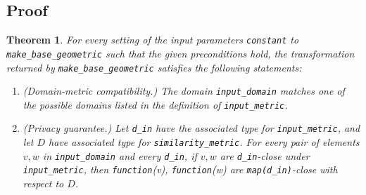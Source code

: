 \documentclass[11pt,a4paper]{article}
\newtheorem{theorem}{Theorem}[section]
\newcommand{\vicki}[1]{{ {\color{olive}{(vicki)~#1}}}}
\begin{document}
\vicki{marked bounds with [SELF::MIN, SELF::MAX] because it's an optional type in the original Rust code, and if not specified, then in SampleTwoSidedGeometric SELF::MIN and SELF::MAX are substituted}



\subsection{Proof}

\begin{theorem}
For every setting of the input parameters \texttt{constant} to \texttt{make\_base\_geometric} such that the given preconditions hold, the transformation returned by \texttt{make\_base\_geometric} satisfies the following statements:

\begin{enumerate}
    \item \textup{(Domain-metric compatibility.)} The domain \texttt{input\_domain} matches one of the possible domains listed in the definition of \texttt{input\_metric}. 
    \item \textup{(Privacy guarantee.)} Let \texttt{d\_in} have the associated type for \texttt{input\_metric}, and let $D$ have associated type for \texttt{similarity\_metric}. For every pair of elements $v, w$ in \texttt{input\_domain} and every \texttt{d\_in}, if $v, w$ are \texttt{d\_in}-close under \texttt{input\_metric}, then \texttt{function}(v), \texttt{function}(w) are \texttt{map(d\_in)}-close with respect to $D$.
\end{enumerate}
\end{theorem}
\end{document}
